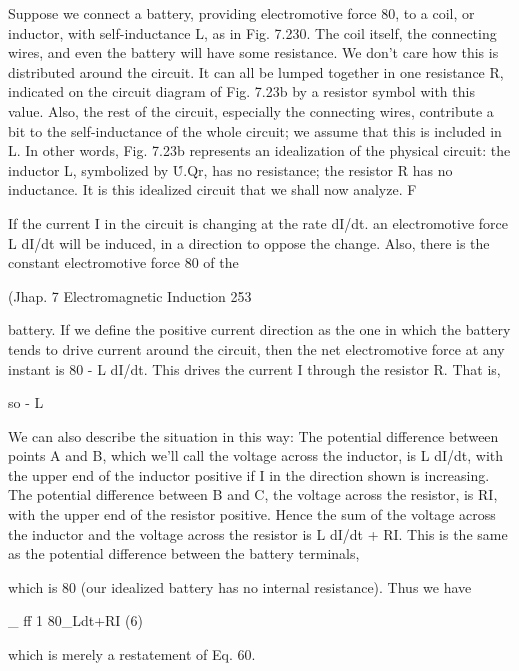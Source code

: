 Suppose we connect a battery, providing electromotive force 80,
to a coil, or inductor, with self-inductance L, as in Fig. 7.230. The
coil itself, the connecting wires, and even the battery will have some
resistance. We don't care how this is distributed around the circuit.
It can all be lumped together in one resistance R, indicated on the
circuit diagram of Fig. 7.23b by a resistor symbol with this value.
Also, the rest of the circuit, especially the connecting wires, contribute
a bit to the self-inductance of the whole circuit; we assume that
this is included in L. In other words, Fig. 7.23b represents an
idealization of the physical circuit: the inductor L, symbolized by
\.U.Qr, has no resistance; the resistor R has no inductance. It is
this idealized circuit that we shall now analyze. F

If the current I in the circuit is changing at the rate dI/dt. an electromotive
force L dI/dt will be induced, in a direction to oppose the
change. Also, there is the constant electromotive force 80 of the

(Jhap. 7 Electromagnetic Induction 253

battery. If we define the positive current direction as the one in
which the battery tends to drive current around the circuit, then the
net electromotive force at any instant is 80 - L dI/dt. This drives
the current I through the resistor R. That is,

\begin{equation}
\end{equation}
so - L%

We can also describe the situation in this way: The potential difference
between points A and B, which we'll call the voltage across
the inductor, is L dI/dt, with the upper end of the inductor positive
if I in the direction shown is increasing. The potential difference
between B and C, the voltage across the resistor, is RI, with the upper
end of the resistor positive. Hence the sum of the voltage across the
inductor and the voltage across the resistor is L dI/dt + RI. This is
the same as the potential difference between the battery terminals,

which is 80 (our idealized battery has no internal resistance). Thus
we have

\begin{equation}
\end{equation}
_ ff 1
80_Ldt+RI (6)

which is merely a restatement of Eq. 60.

